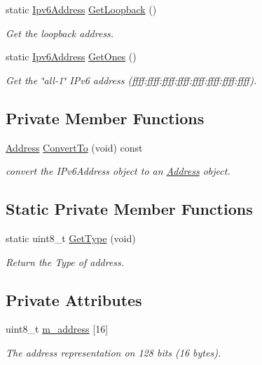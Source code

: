 \begin{DoxyCompactItemize}
static \hyperlink{classns3_1_1Ipv6Address}{Ipv6\+Address} \hyperlink{classns3_1_1Ipv6Address_af62754355f28fadc671584dd02cd79b7}{Get\+Loopback} ()
\begin{DoxyCompactList}\small\item\em Get the loopback address. \end{DoxyCompactList}\item 
static \hyperlink{classns3_1_1Ipv6Address}{Ipv6\+Address} \hyperlink{classns3_1_1Ipv6Address_aca517aa427c2940ca529ba077bcd40f9}{Get\+Ones} ()
\begin{DoxyCompactList}\small\item\em Get the \char`\"{}all-\/1\char`\"{} I\+Pv6 address (ffff\+:ffff\+:ffff\+:ffff\+:ffff\+:ffff\+:ffff\+:ffff). \end{DoxyCompactList}\end{DoxyCompactItemize}
\subsection*{Private Member Functions}
\begin{DoxyCompactItemize}
\item 
\hyperlink{classns3_1_1Address}{Address} \hyperlink{classns3_1_1Ipv6Address_ab2705d8de6b8cc6d66a28ad8cec02136}{Convert\+To} (void) const 
\begin{DoxyCompactList}\small\item\em convert the I\+Pv6\+Address object to an \hyperlink{classns3_1_1Address}{Address} object. \end{DoxyCompactList}\end{DoxyCompactItemize}
\subsection*{Static Private Member Functions}
\begin{DoxyCompactItemize}
\item 
static uint8\+\_\+t \hyperlink{classns3_1_1Ipv6Address_ae6c0f721d13686cbeabe6f377d48b2f9}{Get\+Type} (void)
\begin{DoxyCompactList}\small\item\em Return the Type of address. \end{DoxyCompactList}\end{DoxyCompactItemize}
\subsection*{Private Attributes}
\begin{DoxyCompactItemize}
\item 
uint8\+\_\+t \hyperlink{classns3_1_1Ipv6Address_abed5a405daedc6ed189f770f44cb04e5}{m\+\_\+address} \mbox{[}16\mbox{]}
\begin{DoxyCompactList}\small\item\em The address representation on 128 bits (16 bytes). \end{DoxyCompactList}\end{DoxyCompactItemize}
